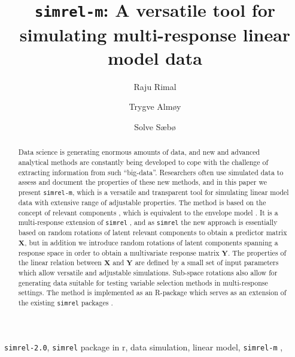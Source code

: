 \documentclass[12pt,A4paper,authoryear]{elsarticle} %
\begin{document}
\begin{frontmatter}

  \title{\texttt{simrel-m}: A versatile tool for simulating multi-response linear
model data}
    \author[]{Raju Rimal}
  
  
    \author[]{Trygve Almøy}
  
  
    \author[Norwegian University of Life Sciences]{Solve Sæbø}
  
    
  \begin{abstract}
    \small
    Data science is generating enormous amounts of data, and new and
    advanced analytical methods are constantly being developed to cope with
    the challenge of extracting information from such ``big-data''.
    Researchers often use simulated data to assess and document the
    properties of these new methods, and in this paper we present
    \texttt{simrel-m}, which is a versatile and transparent tool for
    simulating linear model data with extensive range of adjustable
    properties. The method is based on the concept of relevant components
    \citet{helland1994comparison}, which is equivalent to the envelope model
    \citet{cook2013envelopes}. It is a multi-response extension of
    \texttt{simrel} \citet{saebo2015simrel}, and as \texttt{simrel} the new
    approach is essentially based on random rotations of latent relevant
    components to obtain a predictor matrix \(\mathbf{X}\), but in addition
    we introduce random rotations of latent components spanning a response
    space in order to obtain a multivariate response matrix \(\mathbf{Y}\).
    The properties of the linear relation between \(\mathbf{X}\) and
    \(\mathbf{Y}\) are defined by a small set of input parameters which
    allow versatile and adjustable simulations. Sub-space rotations also
    allow for generating data suitable for testing variable selection
    methods in multi-response settings. The method is implemented as an
    R-package which serves as an extension of the existing \texttt{simrel}
    packages \citet{saebo2015simrel}.
  \end{abstract}
   \begin{keyword} \footnotesize \texttt{simrel-2.0}, \texttt{simrel} package in r, data
simulation, linear model, \texttt{simrel-m} \sep \end{keyword}
\end{frontmatter}
\end{document}
